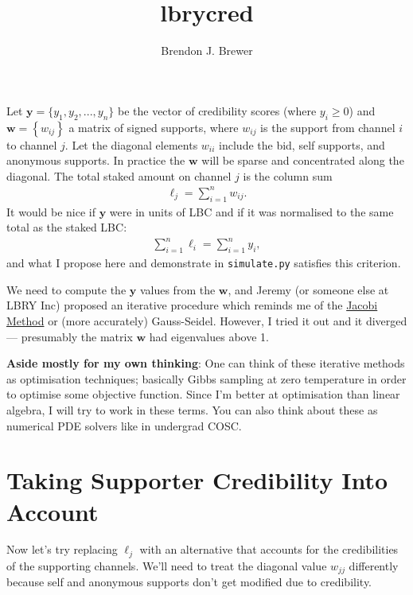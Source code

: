 \documentclass[a4paper, 12pt]{article}
\title{lbrycred}
\author{Brendon J. Brewer}
\date{}
\begin{document}
\maketitle


\setlength{\parindent}{0pt}
\setlength{\parskip}{8pt}

Let $\boldsymbol{y} = \{y_1, y_2, ..., y_n\}$ be the vector of credibility
scores (where $y_i \geq 0$) and $\boldsymbol{w} = \left\{w_{ij}\right\}$
a matrix of signed supports, where
$w_{ij}$ is the support from channel $i$ to channel $j$. Let the diagonal
elements $w_{ii}$ include the bid, self supports, and anonymous supports.
In practice the $\boldsymbol{w}$ will be sparse and concentrated along the
diagonal. The total staked amount on channel $j$ is the column sum
\begin{align}
\ell_j = \sum_{i=1}^n w_{ij}.\label{eqn:total_lbc}
\end{align}
It would be nice if $\boldsymbol{y}$ were in units of LBC and if
it was normalised to the same total as the staked LBC:
\begin{align}
\sum_{i=1}^n \ell_i = \sum_{i=1}^n y_i,
\end{align}
and what I propose here and demonstrate in {\tt simulate.py} satisfies this
criterion.

We need to compute the $\boldsymbol{y}$ values from the $\boldsymbol{w}$,
and Jeremy (or someone else at LBRY Inc) proposed an iterative procedure which
reminds me of the
\href{https://en.wikipedia.org/wiki/Jacobi_method}{Jacobi Method} or
(more accurately) Gauss-Seidel. However,
I tried it out and it diverged --- presumably the matrix $\boldsymbol{w}$ had
eigenvalues above 1.

{\bf Aside mostly for my own thinking}:
One can think of these iterative methods as optimisation techniques; basically
Gibbs sampling at zero temperature in order to optimise some objective
function. Since I'm better at optimisation than linear algebra, I will try to
work in these terms. You can also think about these as numerical PDE solvers
like in undergrad COSC.


\section{Taking Supporter Credibility Into Account}
Now let's try replacing $\ell_j$ with an alternative that accounts for the
credibilities of the supporting channels. We'll need to treat the diagonal
value $w_{jj}$ differently because self and anonymous supports don't get
modified due to credibility.
\end{document}
